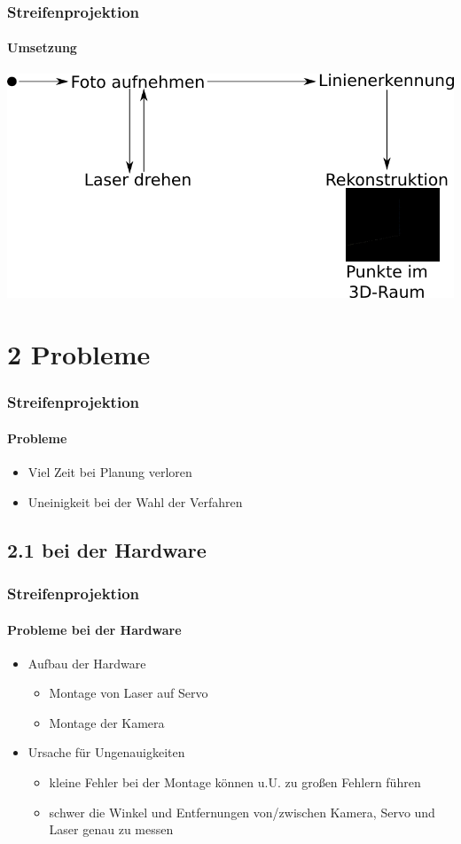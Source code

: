 \documentclass{beamer}
\begin{document}
\begin{frame}
	\frametitle{Streifenprojektion}
	\framesubtitle{Umsetzung}

	
	\includegraphics[width=\linewidth]{includes/blockbild_3d.png}

\end{frame}


\section{2 \hspace{5px} Probleme}
\begin{frame}
	\frametitle{Streifenprojektion}
	\framesubtitle{Probleme}

	\begin{itemize}
		\item Viel Zeit bei Planung verloren
		\item Uneinigkeit bei der Wahl der Verfahren
	\end{itemize}

\end{frame}

\subsection{2.1 \hspace{5px} bei der Hardware}
\begin{frame}
	\frametitle{Streifenprojektion}
	\framesubtitle{Probleme bei der Hardware}

	\begin{itemize}
		\item Aufbau der Hardware
		\begin{itemize}
			\item Montage von Laser auf Servo
			\item Montage der Kamera
		\end{itemize}
		\item Ursache für Ungenauigkeiten
		\begin{itemize}
			\item kleine Fehler bei der Montage können u.U. zu großen Fehlern führen
			\item schwer die Winkel und Entfernungen von/zwischen Kamera, Servo und Laser genau zu messen 
		\end{itemize}
	\end{itemize}

\end{frame}
\end{document}

